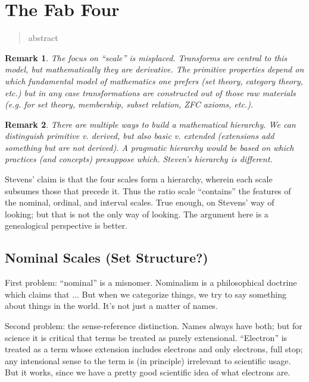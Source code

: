 \documentclass[11pt,twoside]{article}
\newtheorem{remark}{Remark}
\begin{document}
\clearpage
\section{The Fab Four}

\begin{abstract}
abstract
\end{abstract}

\begin{remark}
  The focus on ``scale'' is misplaced.  Transforms are central to this
  model, but mathematically they are derivative.  The primitive
  properties depend on which fundamental model of mathematics one
  prefers (set theory, category theory, etc.) but in any case
  transformations are constructed out of those raw materials (e.g. for
  set theory, membership, subset relation, ZFC axioms, etc.).
\end{remark}

\begin{remark}
  There are multiple ways to build a mathematical hierarchy.  We can
  distinguish primitive v. derived, but also basic v. extended
  (extensions add something but are not derived).  A pragmatic
  hierarchy would be based on which practices (and concepts)
  presuppose which.  Steven's hierarchy is different.
\end{remark}

Stevens' claim is that the four scales form a hierarchy, wherein each
scale subsumes those that precede it.  Thus the ratio scale
``contains'' the features of the nominal, ordinal, and interval
scales.  True enough, on Stevens' way of looking; but that is not the
only way of looking.  The argument here is a genealogical perspective
is better.

\subsection{Nominal Scales (Set Structure?)}

First problem: ``nominal'' is a misnomer.  Nominalism is a
philosophical doctrine which claims that ...  But when we categorize
things, we try to say something about things in the world.  It's not
just a matter of names.

Second problem: the sense-reference distinction.  Names always have
both; but for science it is critical that terms be treated as purely
extensional.  ``Electron'' is treated as a term whose extension
includes electrons and only electrons, full stop; any intensional
sense to the term is (in principle) irrelevant to scientific usage.
But it works, since we have a pretty good scientific idea of what
electrons are.
\end{document}
